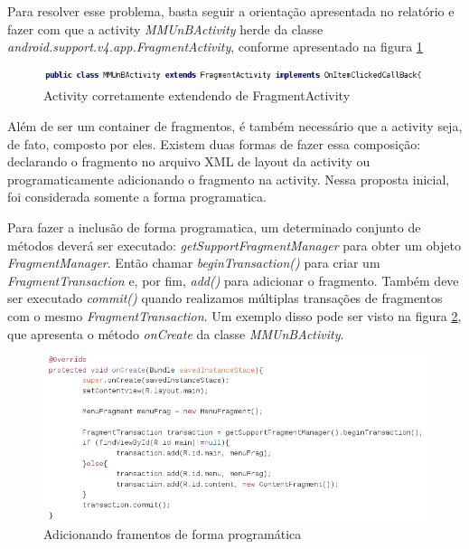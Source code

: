 Para resolver esse problema, basta seguir a orientação apresentada no relatório
e fazer com que a activity {\it MMUnBActivity} herde da classe
{\it android.support.v4.app.FragmentActivity}, conforme apresentado na figura
\ref{herda_FragmentActivity}

\begin{figure}[h]
    \centering
    \includegraphics[width=15cm]{img/heranca_FragmentActivity.png}
    \caption{Activity corretamente extendendo de FragmentActivity}
    \label{herda_FragmentActivity}
\end{figure}

Além de ser um container de fragmentos, é também necessário que a activity seja,
de fato, composto por eles. Existem duas formas de fazer essa composição:
declarando o fragmento no arquivo XML de layout da activity ou programaticamente
adicionando o fragmento na activity. Nessa proposta inicial, foi considerada
somente a forma programatica.

Para fazer a inclusão de forma programatica, um determinado conjunto de métodos
deverá ser executado: {\it getSupportFragmentManager} para obter um objeto {\it
FragmentManager}. Então chamar {\it beginTransaction()} para criar um {\it
FragmentTransaction} e, por fim, {\it add()} para adicionar o fragmento. Também
deve ser executado {\it commit()} quando realizamos múltiplas transações de 
fragmentos com o mesmo {\it FragmentTransaction}. Um exemplo disso pode ser visto
na figura \ref{adicao_fragmento}, que apresenta o método {\it onCreate} da classe
{\it MMUnBActivity}.

\begin{figure}[h]
    \centering
    \includegraphics[width=15cm]{img/add_fragment.png}
    \caption{Adicionando framentos de forma programática}
    \label{adicao_fragmento}
\end{figure}


